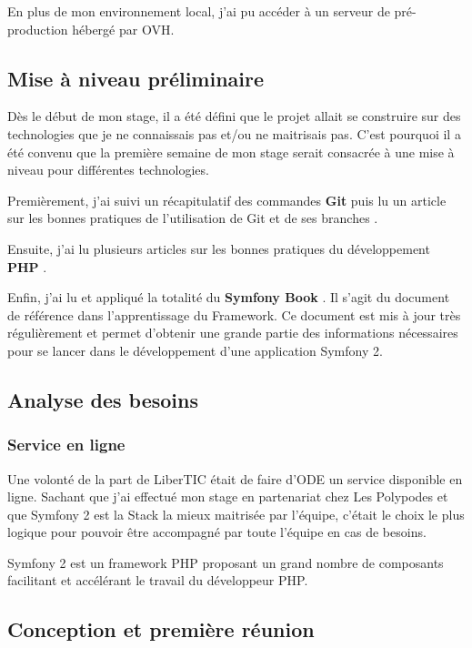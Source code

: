 En plus de mon environnement local, j'ai pu accéder à un serveur de pré-production hébergé par OVH.

\subsection{Mise à niveau préliminaire}

Dès le début de mon stage, il a été défini que le projet allait se construire sur des technologies que je ne connaissais pas et/ou ne maitrisais pas. C'est pourquoi il a été convenu que la première semaine de mon stage serait consacrée à une mise à niveau pour différentes technologies.

Premièrement, j'ai suivi un récapitulatif des commandes \textbf{Git}  puis lu un article sur les bonnes pratiques de l'utilisation de Git et de ses branches .

Ensuite, j'ai lu plusieurs articles sur les bonnes pratiques du développement \textbf{PHP}  .

Enfin, j'ai lu et appliqué la totalité du \textbf{Symfony Book} . Il s'agit du document de référence dans l'apprentissage du Framework. Ce document est mis à jour très régulièrement et permet d'obtenir une grande partie des informations nécessaires pour se lancer dans le développement d'une application Symfony 2.

\subsection{Analyse des besoins}

\subsubsection*{Service en ligne}

Une volonté de la part de LiberTIC était de faire d'ODE un service disponible en ligne. 
Sachant que j'ai effectué mon stage en partenariat chez Les Polypodes et que Symfony 2 est la Stack la mieux maitrisée par l'équipe, c'était le choix le plus logique pour pouvoir être accompagné par toute l'équipe en cas de besoins.

Symfony 2 est un framework PHP proposant un grand nombre de composants facilitant et accélérant le travail du développeur PHP.

\subsection{Conception et première réunion}

